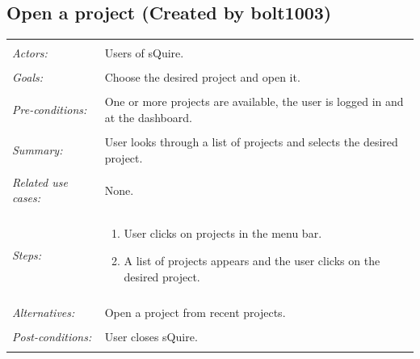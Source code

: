 \documentclass[11pt]{report}
\begin{document}
\subsection{Open a project (Created by bolt1003)}
\begin{tabular}{ p{2cm} p{12cm} }
 \hline
 \\
 \textit{Actors:} & Users of sQuire. \\ 
 \\
 \textit{Goals:} & Choose the desired project and open it. \\
 \\
 \textit{Pre-conditions:} & One or more projects are available, the user is logged in and at the dashboard. \\
 \\
 \textit{Summary:} & User looks through a list of projects and selects the desired project. \\ 
 \\
 \textit{Related use cases:} & None. \\ 
 \\
 \textit{Steps:} & \begin{enumerate}
  \item User clicks on projects in the menu bar.
  \item A list of projects appears and the user clicks on the desired project.
 \end{enumerate} \\
 \\
 \textit{Alternatives:} & Open a project from recent projects. \\
 \\
 \textit{Post-conditions:} & User closes sQuire. \\
 \\
\hline
\end{tabular}
\end{document}

